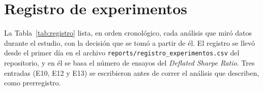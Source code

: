 \documentclass[11pt,a4paper]{article}
\begin{document}
\newpage
\appendix

\section{Registro de experimentos}\label{app:registro}

La Tabla~\ref{tab:registro} lista, en orden cronológico, cada análisis que miró datos durante el estudio, con la decisión que se tomó a partir de él. El registro se llevó desde el primer día en el archivo \texttt{reports/}\allowbreak\texttt{registro\_experimentos.csv} del repositorio, y en él se basa el número de ensayos del \emph{Deflated Sharpe Ratio}. Tres entradas (E10, E12 y E13) se escribieron antes de correr el análisis que describen, como prerregistro.
\end{document}
